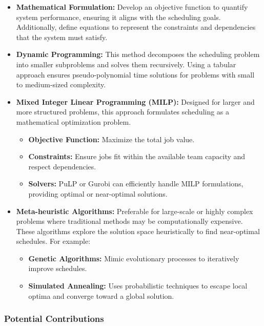 \documentclass[12pt]{article}
\begin{document}
\begin{itemize} 
\item \textbf{Mathematical Formulation:} Develop an objective function to quantify system performance, ensuring it aligns with the scheduling goals. Additionally, define equations to represent the constraints and dependencies that the system must satisfy.
\item \textbf{Dynamic Programming:} This method decomposes the scheduling problem into smaller subproblems and solves them recursively. Using a tabular approach ensures pseudo-polynomial time solutions for problems with small to medium-sized complexity.
\item \textbf{Mixed Integer Linear Programming (MILP):} Designed for larger and more structured problems, this approach formulates scheduling as a mathematical optimization problem. 
\begin{itemize}
    \item \textbf{Objective Function:} Maximize the total job value.\vspace{-0.5em}
    \item \textbf{Constraints:} Ensure jobs fit within the available team capacity and respect dependencies.
    \item \textbf{Solvers:} PuLP or Gurobi can efficiently handle MILP formulations, providing optimal or near-optimal solutions.
\end{itemize}
\item \textbf{Meta-heuristic Algorithms:} Preferable for large-scale or highly complex problems where traditional methods may be computationally expensive. These algorithms explore the solution space heuristically to find near-optimal schedules. For example:
\begin{itemize}
    \item \textbf{Genetic Algorithms:} Mimic evolutionary processes to iteratively improve schedules.\vspace{-0.5em}
    \item \textbf{Simulated Annealing:} Uses probabilistic techniques to escape local optima and converge toward a global solution.
\end{itemize}
\end{itemize}

\subsubsection*{Potential Contributions}
\end{document}
